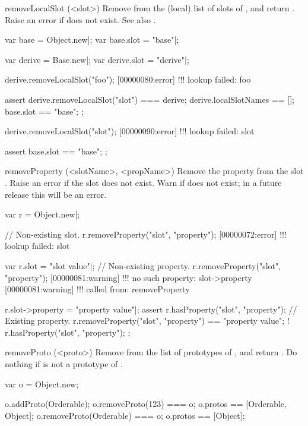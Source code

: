 \begin{urbiscriptapi}
\item[removeLocalSlot](<slot>)%
  Remove  from the (local) list of slots of \this, and return
  \this.  Raise an error if  does not exist.  See also
  .
\begin{urbiscript}
var base = Object.new|;
var base.slot = "base"|;

var derive = Base.new|;
var derive.slot = "derive"|;

derive.removeLocalSlot("foo");
[00000080:error] !!! lookup failed: foo

assert
{
  derive.removeLocalSlot("slot") === derive;
  derive.localSlotNames == [];
  base.slot == "base";
};

derive.removeLocalSlot("slot");
[00000090:error] !!! lookup failed: slot

assert
{
  base.slot == "base";
};
\end{urbiscript}


\item[removeProperty](<slotName>, <propName>)%
  Remove the property  from the slot .  Raise an
  error if the slot does not exist.  Warn if  does not exist;
  in a future release this will be an error.
\begin{urbiscript}
var r = Object.new|;

// Non-existing slot.
r.removeProperty("slot", "property");
[00000072:error] !!! lookup failed: slot

var r.slot = "slot value"|;
// Non-existing property.
r.removeProperty("slot", "property");
[00000081:warning] !!! no such property: slot->property
[00000081:warning] !!!    called from: removeProperty

r.slot->property = "property value"|;
assert
{
  r.hasProperty("slot", "property");
  // Existing property.
  r.removeProperty("slot", "property") == "property value";
  ! r.hasProperty("slot", "property");
};
\end{urbiscript}


\item[removeProto](<proto>)%
  Remove  from the list of prototypes of \this, and return \this.
  Do nothing if  is not a prototype of \this.
\begin{urbiassert}
var o = Object.new;

o.addProto(Orderable);
o.removeProto(123) === o;
o.protos == [Orderable, Object];
o.removeProto(Orderable) === o;
o.protos == [Object];
\end{urbiassert}



\end{urbiscriptapi}
